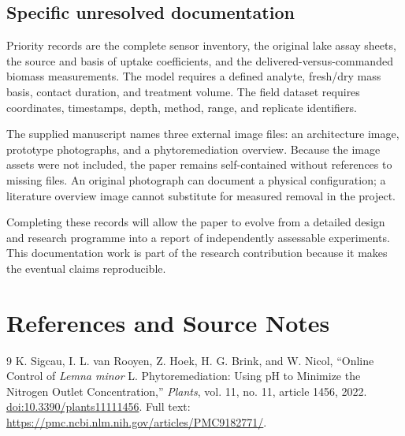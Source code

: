 \documentclass[12pt,a4paper]{article}
\begin{document}
\subsection{Specific unresolved documentation}
Priority records are the complete sensor inventory, the original lake assay sheets, the source and basis of uptake coefficients, and the delivered-versus-commanded biomass measurements. The model requires a defined analyte, fresh/dry mass basis, contact duration, and treatment volume. The field dataset requires coordinates, timestamps, depth, method, range, and replicate identifiers.

The supplied manuscript names three external image files: an architecture image, prototype photographs, and a phytoremediation overview. Because the image assets were not included, the paper remains self-contained without references to missing files. An original photograph can document a physical configuration; a literature overview image cannot substitute for measured removal in the project.

Completing these records will allow the paper to evolve from a detailed design and research programme into a report of independently assessable experiments. This documentation work is part of the research contribution because it makes the eventual claims reproducible.

\clearpage
\section*{References and Source Notes}
\begingroup
\renewcommand{\refname}{Verified Research Reference}
\begin{thebibliography}{9}
K. Sigcau, I. L. van Rooyen, Z. Hoek, H. G. Brink, and W. Nicol,
``Online Control of \textit{Lemna minor} L. Phytoremediation: Using pH to Minimize the Nitrogen Outlet Concentration,''
\textit{Plants}, vol. 11, no. 11, article 1456, 2022.
\href{https://doi.org/10.3390/plants11111456}{doi:10.3390/plants11111456}.
Full text: \url{https://pmc.ncbi.nlm.nih.gov/articles/PMC9182771/}.
\end{thebibliography}
\endgroup
\end{document}
